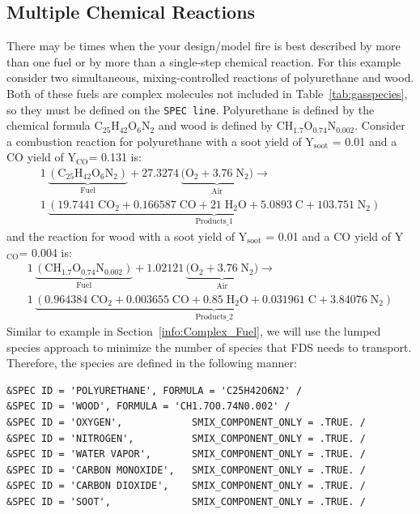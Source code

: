 \documentclass[11pt]{book}
\newcommand{\ct}{\tt\small}
\begin{document}
\subsection{Multiple Chemical Reactions}
\label{info:multi-reac}
There may be times when the your design/model fire is best described by more than one fuel or by more than a single-step chemical reaction. For this example consider two simultaneous, mixing-controlled reactions of polyurethane and wood. Both of these fuels are complex molecules not included in Table~\ref{tab:gasspecies}, so they must be defined on the {\ct SPEC line}. Polyurethane is defined by the chemical formula C$_{25}$H$_{42}$O$_{6}$N$_{2}$ and wood is defined by CH$_{1.7}$O$_{0.74}$N$_{0.002}$. Consider a combustion reaction for polyurethane with a soot yield of Y$_{\mathrm{soot}}$ = 0.01 and a CO yield of Y$_{\mathrm{CO}}$= 0.131 \cite{SFPE:Tewarson} is:
\begin{eqnarray}\label{eq:pu_combust}
1\,\underbrace{\mathrm{(C_{25}H_{42}O_{6}N_{2})}}_\text{Fuel} + 27.3274\,\underbrace{\mathrm{(O_2 + 3.76 \; N_2})}_\text{Air} \rightarrow \\
\nonumber 1\,\underbrace{\mathrm{(19.7441\; CO_2 + 0.166587 \; CO + 21 \; H_2O + 5.0893\; C + 103.751 \; N_2)}}_\text{Products\_1}
\end{eqnarray}
and the reaction for wood with a soot yield of Y$_{\mathrm{soot}}$ = 0.01 and a CO yield of Y$_{\mathrm{CO}}$= 0.004 \cite{SFPE:Tewarson} is:
\begin{eqnarray}\label{eq:wood_combust}
1\,\underbrace{\mathrm{(CH_{1.7}O_{0.74}N_{0.002})}}_\text{Fuel} + 1.02121\,\underbrace{\mathrm{(O_2 + 3.76 \; N_2})}_\text{Air} \rightarrow \\
\nonumber 1\,\underbrace{\mathrm{(0.964384\; CO_2 + 0.003655 \; CO + 0.85 \; H_2O + 0.031961\; C + 3.84076 \; N_2)}}_\text{Products\_2}
\end{eqnarray}
Similar to example in Section~\ref{info:Complex_Fuel}, we will use the lumped species approach to minimize the number of species that FDS needs to transport. Therefore, the species are defined in the following manner:
\footnotesize \begin{verbatim}
&SPEC ID = 'POLYURETHANE', FORMULA = 'C25H42O6N2' /
&SPEC ID = 'WOOD', FORMULA = 'CH1.7O0.74N0.002' /
&SPEC ID = 'OXYGEN',            SMIX_COMPONENT_ONLY = .TRUE. /
&SPEC ID = 'NITROGEN',          SMIX_COMPONENT_ONLY = .TRUE. /
&SPEC ID = 'WATER VAPOR',       SMIX_COMPONENT_ONLY = .TRUE. /
&SPEC ID = 'CARBON MONOXIDE',   SMIX_COMPONENT_ONLY = .TRUE. /
&SPEC ID = 'CARBON DIOXIDE',    SMIX_COMPONENT_ONLY = .TRUE. /
&SPEC ID = 'SOOT',              SMIX_COMPONENT_ONLY = .TRUE. /
\end{verbatim} \normalsize
\end{document}
